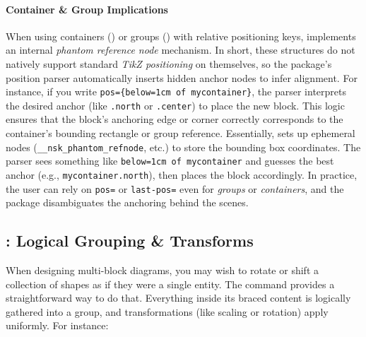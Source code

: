 \documentclass[show-experimental]{l3doc}
\begin{document}
\paragraph{Container \& Group Implications}
When using containers () or groups () with relative positioning keys,  implements an internal \emph{phantom reference node} mechanism. In short, these structures do not natively support standard \emph{TikZ positioning} on themselves, so the package's position parser automatically inserts hidden anchor nodes to infer alignment. For instance, if you write \verb|pos={below=1cm of mycontainer}|, the parser interprets the desired anchor (like \verb|.north| or \verb|.center|) to place the new block. This logic ensures that the block’s anchoring edge or corner correctly corresponds to the container’s bounding rectangle or group reference. Essentially,  sets up ephemeral nodes (\texttt{\_\_nsk\_phantom\_refnode}, etc.) to store the bounding box coordinates. The parser sees something like \texttt{below=1cm of mycontainer} and guesses the best anchor (e.g., \verb|mycontainer.north|), then places the block accordingly. In practice, the user can rely on \verb|pos=| or \verb|last-pos=| even for \emph{groups} or \emph{containers}, and the package disambiguates the anchoring behind the scenes.

\begin{nskexample}[sidebyside, righthand width=4cm]
	\begin{nskFigure}[center]
		\nskContainer[
			id=ag,
			padding=3mm,
			fill=nskStrongRed!20,
			border-radius=0mm,
			border-color=nskStrongRed!50,
		]{
			\nskBlock[
				id=A,
				text-center={A},
				fill=nskRed,
				width=1cm, height=1cm,
			]
		}
		\nskBlock[
			text-center={B},
			fill=nskGreen,
			width=1cm, height=1cm,
			border-radius=0mm,
			pos={right=0cm of ag},
		]
		\nskBlock[
			text-center={C},
			fill=nskPink,
			width=1cm, height=1cm,
			border-radius=0mm,
			pos={below=0cm of ag},
		]
	\end{nskFigure}
\end{nskexample}


\subsection{\texorpdfstring{}{}: Logical Grouping \& Transforms}
When designing multi-block diagrams, you may wish to rotate or shift a collection of shapes as if they were a single entity. The  command provides a straightforward way to do that. Everything inside its braced content is logically gathered into a group, and transformations (like scaling or rotation) apply uniformly. For instance:
\end{document}
